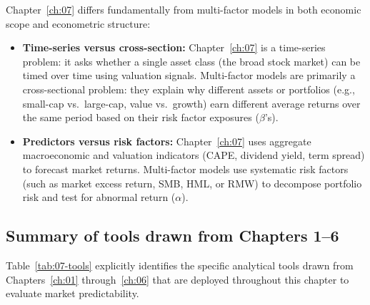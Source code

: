 Chapter~\ref{ch:07} differs fundamentally from multi-factor models in both economic scope and econometric structure:

\begin{itemize}
  \item \textbf{Time-series versus cross-section:} Chapter~\ref{ch:07} is a time-series problem: it asks whether a single asset class (the broad stock market) can be timed over time using valuation signals. Multi-factor models are primarily a cross-sectional problem: they explain why different assets or portfolios (e.g., small-cap vs.\ large-cap, value vs.\ growth) earn different average returns over the same period based on their risk factor exposures ($\beta$'s).
  \item \textbf{Predictors versus risk factors:} Chapter~\ref{ch:07} uses aggregate macroeconomic and valuation indicators (CAPE, dividend yield, term spread) to forecast market returns. Multi-factor models use systematic risk factors (such as market excess return, SMB, HML, or RMW) to decompose portfolio risk and test for abnormal return ($\alpha$).
\end{itemize}

\subsection{Summary of tools drawn from Chapters 1--6}

Table~\ref{tab:07-tools} explicitly identifies the specific analytical tools drawn from Chapters~\ref{ch:01} through~\ref{ch:06} that are deployed throughout this chapter to evaluate market predictability.

